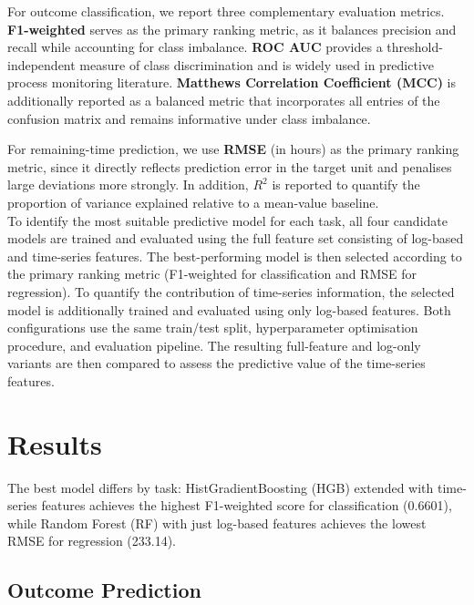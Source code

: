 \documentclass[runningheads]{llncs}
\begin{document}
For outcome classification, we report three complementary evaluation metrics. \textbf{F1-weighted} serves as the primary ranking metric, as it balances precision and recall while accounting for class imbalance. \textbf{ROC AUC} provides a threshold-independent measure of class discrimination and is widely used in predictive process monitoring literature. \textbf{Matthews Correlation Coefficient (MCC)} is additionally reported as a balanced metric that incorporates all entries of the confusion matrix and remains informative under class imbalance.

For remaining-time prediction, we use \textbf{RMSE} (in hours) as the primary ranking metric, since it directly reflects prediction error in the target unit and penalises large deviations more strongly. In addition, \textbf{$R^2$} is reported to quantify the proportion of variance explained relative to a mean-value baseline.
\\

To identify the most suitable predictive model for each task, all four candidate models are trained and evaluated using the full feature set consisting of log-based and time-series features. The best-performing model is then selected according to the primary ranking metric (F1-weighted for classification and RMSE for regression). To quantify the contribution of time-series information, the selected model is additionally trained and evaluated using only log-based features. Both configurations use the same train/test split, hyperparameter optimisation procedure, and evaluation pipeline. The resulting full-feature and log-only variants are then compared to assess the predictive value of the time-series features.

\section{Results}
\label{sec:results}

The best model differs by task: HistGradientBoosting (HGB) extended with time-series features achieves the
highest F1-weighted score for classification (0.6601), while Random Forest (RF) with just log-based features
achieves the lowest RMSE for regression (233.14).

\subsection{Outcome Prediction}
\label{sec:results-outcome}
\end{document}

